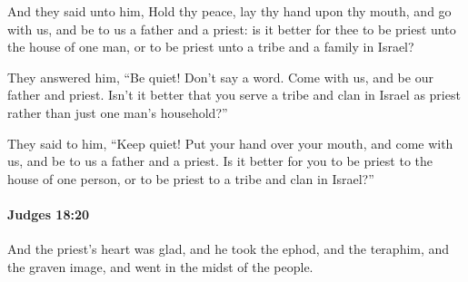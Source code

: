 			\begin{versebox}
					\item[BHS] 
					\item[ASV] And they said unto him, Hold thy peace, lay thy hand upon thy mouth, and go with us, and be to us a father and a priest: is it better for thee to be priest unto the house of one man, or to be priest unto a tribe and a family in Israel?
					\item[NIV] They answered him, “Be quiet! Don’t say a word. Come with us, and be our father and priest. Isn’t it better that you serve a tribe and clan in Israel as priest rather than just one man’s household?”
					\item[NRSV] They said to him, “Keep quiet! Put your hand over your mouth, and come with us, and be to us a father and a priest. Is it better for you to be priest to the house of one person, or to be priest to a tribe and clan in Israel?”
			\end{versebox}

		\paragraph{Judges 18:20} %
			\label{JUDGES-18-20}

			And the priest’s heart was glad, and he took the ephod, and the teraphim, and the graven image, and went in the midst of the people.

